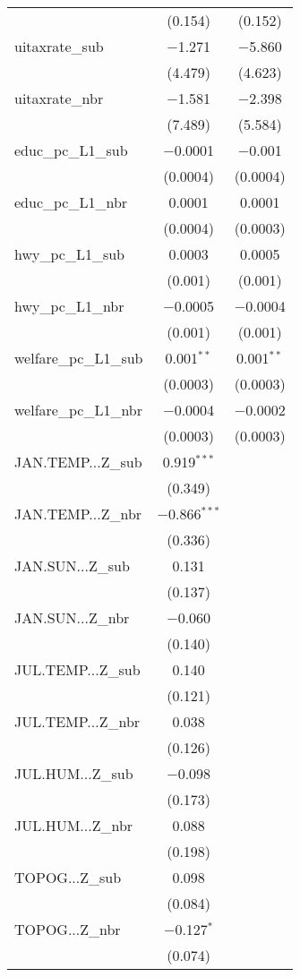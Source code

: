 \begin{table}[!htbp]
\begin{tabular}{@{\extracolsep{5pt}}lcc}
  & (0.154) & (0.152) \\ 
  uitaxrate\_sub & $-$1.271 & $-$5.860 \\ 
  & (4.479) & (4.623) \\ 
  uitaxrate\_nbr & $-$1.581 & $-$2.398 \\ 
  & (7.489) & (5.584) \\ 
  educ\_pc\_L1\_sub & $-$0.0001 & $-$0.001 \\ 
  & (0.0004) & (0.0004) \\ 
  educ\_pc\_L1\_nbr & 0.0001 & 0.0001 \\ 
  & (0.0004) & (0.0003) \\ 
  hwy\_pc\_L1\_sub & 0.0003 & 0.0005 \\ 
  & (0.001) & (0.001) \\ 
  hwy\_pc\_L1\_nbr & $-$0.0005 & $-$0.0004 \\ 
  & (0.001) & (0.001) \\ 
  welfare\_pc\_L1\_sub & 0.001$^{**}$ & 0.001$^{**}$ \\ 
  & (0.0003) & (0.0003) \\ 
  welfare\_pc\_L1\_nbr & $-$0.0004 & $-$0.0002 \\ 
  & (0.0003) & (0.0003) \\ 
  JAN.TEMP...Z\_sub & 0.919$^{***}$ &  \\ 
  & (0.349) &  \\ 
  JAN.TEMP...Z\_nbr & $-$0.866$^{***}$ &  \\ 
  & (0.336) &  \\ 
  JAN.SUN...Z\_sub & 0.131 &  \\ 
  & (0.137) &  \\ 
  JAN.SUN...Z\_nbr & $-$0.060 &  \\ 
  & (0.140) &  \\ 
  JUL.TEMP...Z\_sub & 0.140 &  \\ 
  & (0.121) &  \\ 
  JUL.TEMP...Z\_nbr & 0.038 &  \\ 
  & (0.126) &  \\ 
  JUL.HUM...Z\_sub & $-$0.098 &  \\ 
  & (0.173) &  \\ 
  JUL.HUM...Z\_nbr & 0.088 &  \\ 
  & (0.198) &  \\ 
  TOPOG...Z\_sub & 0.098 &  \\ 
  & (0.084) &  \\ 
  TOPOG...Z\_nbr & $-$0.127$^{*}$ &  \\ 
  & (0.074) &  \\ 

\end{tabular}
\end{table}
